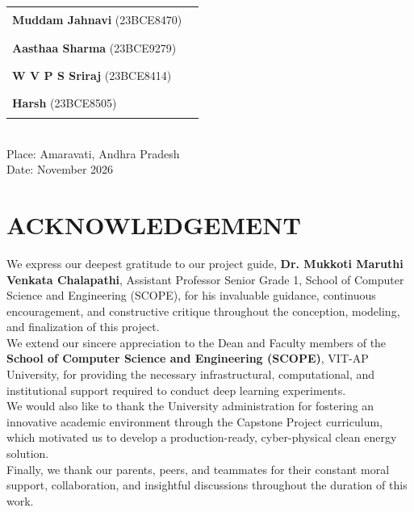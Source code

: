 \documentclass[12pt,a4paper,oneside]{report}
\begin{document}
\noindent
\begin{tabular*}{\textwidth}{@{\extracolsep{\fill}}ll}
\textbf{Muddam Jahnavi} (23BCE8470) & \rule{5cm}{0.4pt} \\[0.8cm]
\textbf{Aasthaa Sharma} (23BCE9279) & \rule{5cm}{0.4pt} \\[0.8cm]
\textbf{W V P S Sriraj} (23BCE8414) & \rule{5cm}{0.4pt} \\[0.8cm]
\textbf{Harsh} (23BCE8505) & \rule{5cm}{0.4pt} \\
\end{tabular*}\\[1.5cm]

\noindent Place: Amaravati, Andhra Pradesh\\
Date: November 2026

\newpage
\chapter*{ACKNOWLEDGEMENT}
\thispagestyle{empty}

\noindent We express our deepest gratitude to our project guide, \textbf{Dr. Mukkoti Maruthi Venkata Chalapathi}, Assistant Professor Senior Grade 1, School of Computer Science and Engineering (SCOPE), for his invaluable guidance, continuous encouragement, and constructive critique throughout the conception, modeling, and finalization of this project.\\[0.5cm]

\noindent We extend our sincere appreciation to the Dean and Faculty members of the \textbf{School of Computer Science and Engineering (SCOPE)}, VIT-AP University, for providing the necessary infrastructural, computational, and institutional support required to conduct deep learning experiments.\\[0.5cm]

\noindent We would also like to thank the University administration for fostering an innovative academic environment through the Capstone Project curriculum, which motivated us to develop a production-ready, cyber-physical clean energy solution.\\[0.5cm]

\noindent Finally, we thank our parents, peers, and teammates for their constant moral support, collaboration, and insightful discussions throughout the duration of this work.

\newpage
\end{document}
